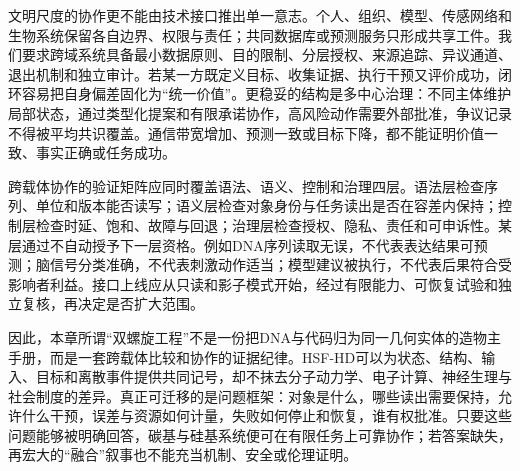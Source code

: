 文明尺度的协作更不能由技术接口推出单一意志。个人、组织、模型、传感网络和生物系统保留各自边界、权限与责任；共同数据库或预测服务只形成共享工件。我们要求跨域系统具备最小数据原则、目的限制、分层授权、来源追踪、异议通道、退出机制和独立审计。若某一方既定义目标、收集证据、执行干预又评价成功，闭环容易把自身偏差固化为“统一价值”。更稳妥的结构是多中心治理：不同主体维护局部状态，通过类型化提案和有限承诺协作，高风险动作需要外部批准，争议记录不得被平均共识覆盖。通信带宽增加、预测一致或目标下降，都不能证明价值一致、事实正确或任务成功。

跨载体协作的验证矩阵应同时覆盖语法、语义、控制和治理四层。语法层检查序列、单位和版本能否读写；语义层检查对象身份与任务读出是否在容差内保持；控制层检查时延、饱和、故障与回退；治理层检查授权、隐私、责任和可申诉性。某层通过不自动授予下一层资格。例如DNA序列读取无误，不代表表达结果可预测；脑信号分类准确，不代表刺激动作适当；模型建议被执行，不代表后果符合受影响者利益。接口上线应从只读和影子模式开始，经过有限能力、可恢复试验和独立复核，再决定是否扩大范围。

因此，本章所谓“双螺旋工程”不是一份把DNA与代码归为同一几何实体的造物主手册，而是一套跨载体比较和协作的证据纪律。HSF-HD可以为状态、结构、输入、目标和离散事件提供共同记号，却不抹去分子动力学、电子计算、神经生理与社会制度的差异。真正可迁移的是问题框架：对象是什么，哪些读出需要保持，允许什么干预，误差与资源如何计量，失败如何停止和恢复，谁有权批准。只要这些问题能够被明确回答，碳基与硅基系统便可在有限任务上可靠协作；若答案缺失，再宏大的“融合”叙事也不能充当机制、安全或伦理证明。


